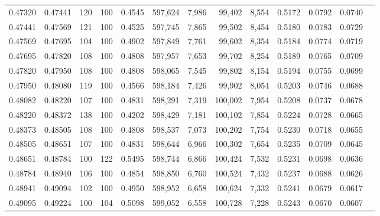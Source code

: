 \begin{tabular}{rrrrrrrrrrrrr}
0.47320 & 0.47441 &   120 & 100 &                                     0.4545 & 597,624 &   7,986 &  99,402 &   8,554 & 0.5172 & 0.0792 & 0.0740 \\
0.47441 & 0.47569 &   121 & 100 &                                     0.4525 & 597,745 &   7,865 &  99,502 &   8,454 & 0.5180 & 0.0783 & 0.0729 \\
0.47569 & 0.47695 &   104 & 100 &                                     0.4902 & 597,849 &   7,761 &  99,602 &   8,354 & 0.5184 & 0.0774 & 0.0719 \\
0.47695 & 0.47820 &   108 & 100 &                                     0.4808 & 597,957 &   7,653 &  99,702 &   8,254 & 0.5189 & 0.0765 & 0.0709 \\
0.47820 & 0.47950 &   108 & 100 &                                     0.4808 & 598,065 &   7,545 &  99,802 &   8,154 & 0.5194 & 0.0755 & 0.0699 \\
0.47950 & 0.48080 &   119 & 100 &                                     0.4566 & 598,184 &   7,426 &  99,902 &   8,054 & 0.5203 & 0.0746 & 0.0688 \\
0.48082 & 0.48220 &   107 & 100 &                                     0.4831 & 598,291 &   7,319 & 100,002 &   7,954 & 0.5208 & 0.0737 & 0.0678 \\
0.48220 & 0.48372 &   138 & 100 &                                     0.4202 & 598,429 &   7,181 & 100,102 &   7,854 & 0.5224 & 0.0728 & 0.0665 \\
0.48373 & 0.48505 &   108 & 100 &                                     0.4808 & 598,537 &   7,073 & 100,202 &   7,754 & 0.5230 & 0.0718 & 0.0655 \\
0.48505 & 0.48651 &   107 & 100 &                                     0.4831 & 598,644 &   6,966 & 100,302 &   7,654 & 0.5235 & 0.0709 & 0.0645 \\
0.48651 & 0.48784 &   100 & 122 &                                     0.5495 & 598,744 &   6,866 & 100,424 &   7,532 & 0.5231 & 0.0698 & 0.0636 \\
0.48784 & 0.48940 &   106 & 100 &                                     0.4854 & 598,850 &   6,760 & 100,524 &   7,432 & 0.5237 & 0.0688 & 0.0626 \\
0.48941 & 0.49094 &   102 & 100 &                                     0.4950 & 598,952 &   6,658 & 100,624 &   7,332 & 0.5241 & 0.0679 & 0.0617 \\
0.49095 & 0.49224 &   100 & 104 &                                     0.5098 & 599,052 &   6,558 & 100,728 &   7,228 & 0.5243 & 0.0670 & 0.0607 \\

\end{tabular}
